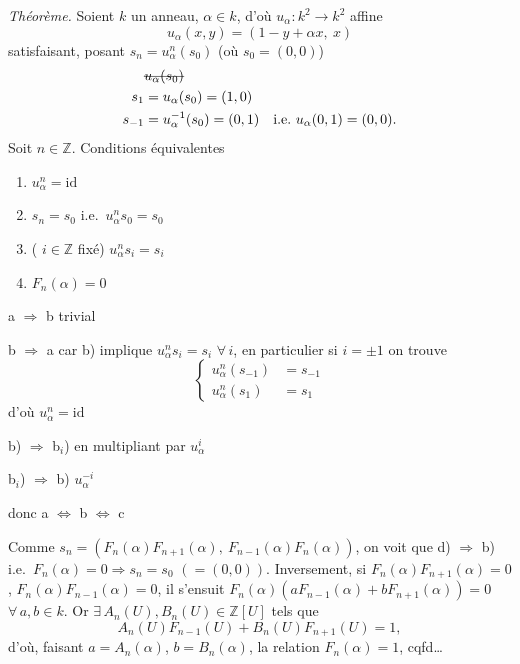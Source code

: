 \documentclass[11pt,a4paper]{article}
\begin{document}
\emph{Théorème.} Soient $k$ un anneau, $\alpha \in k$, d'où $u_\alpha : k^2 \to k^2$   affine
\[
  u_\alpha(x, y) = (1 - y + \alpha x,\ x)
\]
satisfaisant, \struck{\ill{}} posant $s_n = u_\alpha^n(s_0)$ (où $s_0 = (0,0)$)
\[
  \begin{aligned}
    &\text{\struck{$u_\alpha(s_0)$}}\\
    s_1 &= u_\alpha(s_0) = (1, 0)\\
    s_{-1} &= u_\alpha^{-1}(s_0) = (0, 1) \quad \text{i.e.}\ u_\alpha(0,1) = (0,0).
  \end{aligned}
\]
Soit $n \in \mathbb{Z}$. Conditions équivalentes
\begin{enumerate}
  \item[a)] $u_\alpha^n = \mathrm{id}$
  \item[b)] $s_n = s_0$ i.e.\ $u_\alpha^n s_0 = s_0$
  \item[b$_i$)] ( $i \in \mathbb{Z}$ fixé) $u_\alpha^n s_i = s_i$
  \item[d)] $F_n(\alpha) = 0$
\end{enumerate}

a $\Rightarrow$ b trivial

b $\Rightarrow$ a car b) implique $u_\alpha^n s_i = s_i$ $\forall\, i$,  en particulier si $i = \pm 1$ on trouve
\[
  \left\{
  \begin{aligned}
    u_\alpha^n(s_{-1}) &= s_{-1}\\
    u_\alpha^n(s_1) &= s_1
  \end{aligned}
  \right.
\]
d'où $u_\alpha^n = \mathrm{id}$

b) $\Rightarrow$ b$_i$) en multipliant par $u_\alpha^i$

b$_i$) $\Rightarrow$ b)  $u_\alpha^{-i}$ 

donc a $\iff$ b $\iff$ c

Comme $s_n = (F_n(\alpha) F_{n+1}(\alpha),\ F_{n-1}(\alpha) F_n(\alpha))$, on voit que d) $\Rightarrow$ b) i.e.\ $F_n(\alpha) = 0 \Rightarrow s_n = s_0$ $(= (0,0))$. Inversement, si $F_n(\alpha) F_{n+1}(\alpha) = 0$, $F_n(\alpha) F_{n-1}(\alpha) = 0$, il s'ensuit $F_n(\alpha)(a F_{n-1}(\alpha) + b F_{n+1}(\alpha)) = 0$ $\forall\, a, b \in k$. Or $\exists\, A_n(U), B_n(U) \in \mathbb{Z}[U]$ tels que
\[
  A_n(U) F_{n-1}(U) + B_n(U) F_{n+1}(U) = 1,
\]
d'où, faisant $a = A_n(\alpha)$, $b = B_n(\alpha)$, la relation $F_n(\alpha) = 1$, cqfd…
\end{document}
